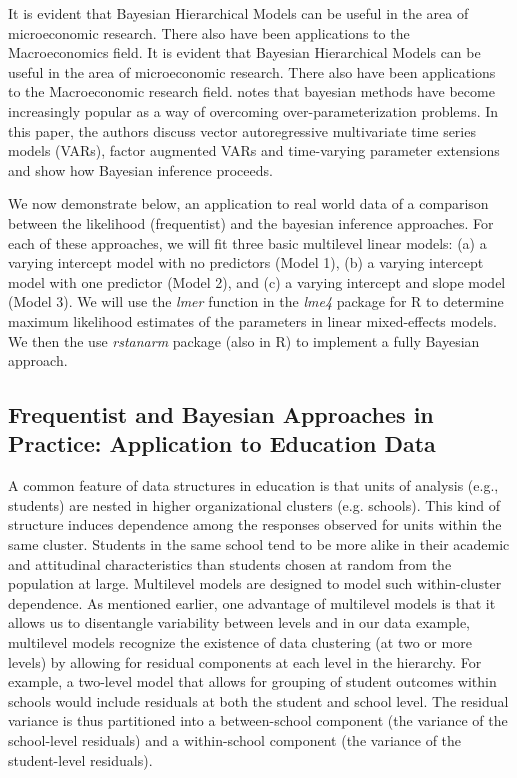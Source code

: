 It is evident that Bayesian Hierarchical Models can be useful in the area of microeconomic research. There also have been applications to the Macroeconomics field. It is evident that Bayesian Hierarchical Models can be useful in the area of microeconomic research. There also have been applications to the Macroeconomic research field. \cite{ koop2010bayesian} notes that bayesian methods have become increasingly popular as a way of overcoming over-parameterization problems. In this paper, the authors discuss vector autoregressive multivariate time
series models (VARs), factor augmented VARs and time-varying parameter extensions and show how Bayesian inference proceeds. 

We now demonstrate below, an application to real world data of a comparison between the likelihood (frequentist)  and the bayesian inference approaches. For each of these approaches, we will fit three basic multilevel linear models: (a) a varying intercept model with no predictors (Model 1), (b) a varying intercept model with one predictor (Model 2), and (c)  a varying intercept and slope model (Model 3). We will use the \textit{lmer} function in the \textit{lme4} package for R to determine maximum likelihood estimates of the parameters in linear mixed-effects models. We then the use \textit{rstanarm} package (also in R) to implement a fully Bayesian approach.




\subsection{Frequentist and Bayesian Approaches in Practice: Application to Education Data}

A common feature of data structures in education is that units of analysis (e.g., students) are nested in higher organizational clusters (e.g. schools). This kind of structure induces dependence among the responses observed for units within the same cluster. Students in the same school tend to be more alike in their academic and attitudinal characteristics than students chosen at random from the population at large. Multilevel models are designed to model such within-cluster dependence. As mentioned earlier, one advantage of multilevel models is that it allows us to disentangle variability between levels and in our data example,  multilevel models recognize the existence of data clustering (at two or more levels) by allowing for residual components at each level in the hierarchy. For example, a two-level model that allows for grouping of student outcomes within schools would include residuals at both the student and school level. The residual variance is thus partitioned into a between-school component (the variance of the school-level residuals) and a within-school component (the variance of the student-level residuals). 


